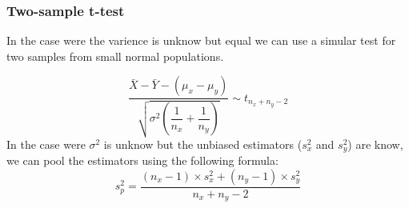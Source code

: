             
        \newpage
        \subsubsection{Two-sample t-test}
            In the case were the varience is unknow but equal we can use a simular test for two samples from small normal populations.

            $$
            \frac{\bar{X} - \bar{Y} - (\mu_x - \mu_y)}{\sqrt{\sigma^2\left(\dfrac{1}{n_x} + \dfrac{1}{n_y}\right)}}
            \sim t_{n_x+n_y-2}
            $$
            In the case were $\sigma^2$ is unknow but the unbiased estimators ($s_x^2$ and $s_y^2$) are know, we can pool the estimators using the following formula:
            $$
            s_p^2 = \frac{(n_x-1)\times s_x^2 + (n_y-1) \times s_y^2}{n_x + n_y - 2}
            $$ 

